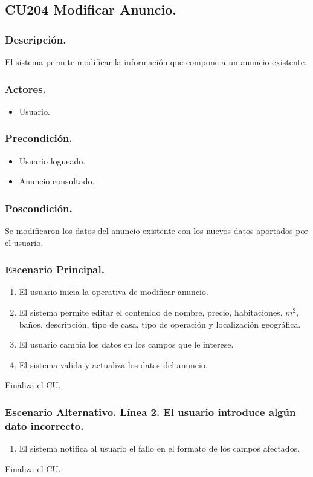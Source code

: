 \subsection{CU204 Modificar Anuncio.}
\subsubsection{Descripci\'{o}n.}
El sistema permite modificar la informaci\'{o}n que compone a un anuncio existente.
\subsubsection{Actores.}
\begin{itemize}
\item Usuario.
\end{itemize}
\subsubsection{Precondici\'{o}n.}
\begin{itemize}
\item Usuario logueado.
\item Anuncio consultado.
\end{itemize}
\subsubsection{Poscondici\'{o}n.}
Se modificaron los datos del anuncio existente con los nuevos datos aportados por el usuario.
\subsubsection{Escenario Principal.}
\begin{enumerate}
\item El usuario inicia la operativa de modificar anuncio.
\item El sistema permite editar el contenido de nombre, precio, habitaciones, $m^{2}$, ba\~{n}os, descripci\'{o}n, tipo de casa, tipo de operaci\'{o}n y localizaci\'{o}n geogr\'{a}fica.
\item El usuario cambia los datos en los campos que le interese.
\item El sistema valida y actualiza los datos del anuncio.
\end{enumerate}
Finaliza el CU.
\subsubsection{Escenario Alternativo. L\'{i}nea 2. El usuario introduce alg\'{u}n dato incorrecto.}
\begin{enumerate}
\item El sistema notifica al usuario el fallo en el formato de los campos afectados.
\end{enumerate}
Finaliza el CU.